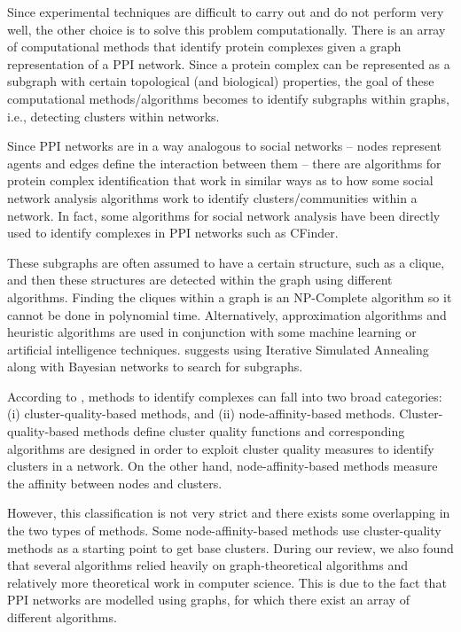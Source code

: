 Since experimental techniques are difficult to carry out and do not perform very well, 
the other choice is to solve this problem computationally. There is an array of computational 
methods that identify protein complexes given a graph representation of a PPI network.
Since a protein complex can be represented as a subgraph with certain topological (and biological)
properties, the goal of these computational methods/algorithms becomes to identify subgraphs 
within graphs, i.e., detecting clusters within networks. 

Since PPI networks are in a way analogous to social networks -- nodes represent agents and 
edges define the interaction between them -- there are algorithms for protein complex 
identification that work in similar ways as to how some social network analysis algorithms work 
to identify clusters/communities within a network. In fact, some algorithms for social network 
analysis have been directly used to identify complexes in PPI networks such as CFinder. 

These subgraphs are often assumed to have a certain structure, such as a clique, and then these
structures are detected within the graph using different algorithms. Finding the cliques within 
a graph is an NP-Complete algorithm so it cannot be done in polynomial time. Alternatively, 
approximation algorithms and heuristic algorithms are used in conjunction with some machine learning
or artificial intelligence techniques. \cite{qi_protein_2008} suggests using Iterative 
Simulated Annealing along with Bayesian networks to search for subgraphs.

According to \cite{wu_comprehensive_2020}, methods to identify complexes can fall into two 
broad categories: (i) cluster-quality-based methods, and (ii) node-affinity-based methods. 
Cluster-quality-based methods define cluster quality functions and corresponding algorithms 
are designed in order to exploit cluster quality measures to identify clusters in a network.
On the other hand, node-affinity-based methods measure the affinity between nodes and clusters. 

However, this classification is not very strict and there exists some overlapping in the two 
types of methods. Some node-affinity-based methods use cluster-quality methods as a starting 
point to get base clusters. During our review, we also found that several algorithms 
relied heavily on graph-theoretical algorithms and relatively more theoretical work in 
computer science. This is due to the fact that PPI networks are modelled using graphs, for which 
there exist an array of different algorithms.

